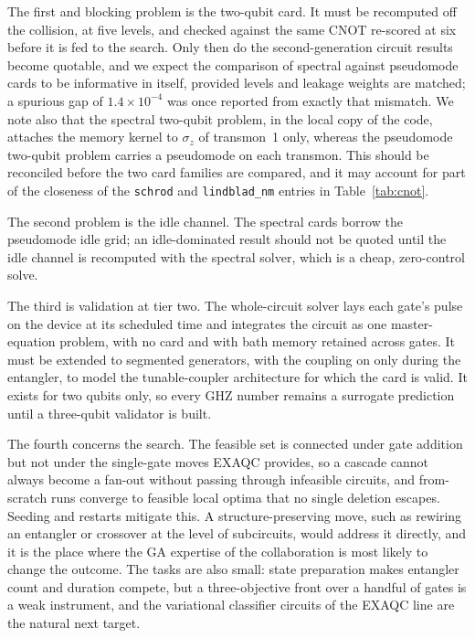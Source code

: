 \documentclass[10pt]{article}
\begin{document}
The first and blocking problem is the two-qubit card. It must be recomputed
off the collision, at five levels, and checked against the same CNOT re-scored
at six before it is fed to the search. Only then do the second-generation
circuit results become quotable, and we expect the comparison of spectral
against pseudomode cards to be informative in itself, provided levels and
leakage weights are matched; a spurious gap of $1.4\times10^{-4}$ was once
reported from exactly that mismatch. We note also that the spectral two-qubit
problem, in the local copy of the code, attaches the memory kernel to $\sigma_z$ of
transmon~1 only, whereas the pseudomode two-qubit problem carries a pseudomode
on each transmon. This should be reconciled before the two card families are
compared, and it may account for part of the closeness of the
\texttt{schrod} and \texttt{lindblad\_nm} entries in Table~\ref{tab:cnot}.

The second problem is the idle channel. The spectral cards borrow the
pseudomode idle grid; an idle-dominated result should not be quoted until the
idle channel is recomputed with the spectral solver, which is a cheap,
zero-control solve.

The third is validation at tier two. The whole-circuit solver lays each gate's
pulse on the device at its scheduled time and integrates the circuit as one
master-equation problem, with no card and with bath memory retained across
gates. It must be extended to segmented generators, with the coupling on only
during the entangler, to model the tunable-coupler architecture for which the
card is valid. It exists for two qubits only, so every GHZ number remains a
surrogate prediction until a three-qubit validator is built.

The fourth concerns the search. The feasible set is connected under gate
addition but not under the single-gate moves EXAQC provides, so a cascade
cannot always become a fan-out without passing through infeasible circuits,
and from-scratch runs converge to feasible local optima that no single
deletion escapes. Seeding and restarts mitigate this. A structure-preserving
move, such as rewiring an entangler or crossover at the level of subcircuits,
would address it directly, and it is the place where the GA expertise of the
collaboration is most likely to change the outcome. The tasks are also small:
state preparation makes entangler count and duration compete, but a
three-objective front over a handful of gates is a weak instrument, and the
variational classifier circuits of the EXAQC line are the natural next target.
\end{document}
